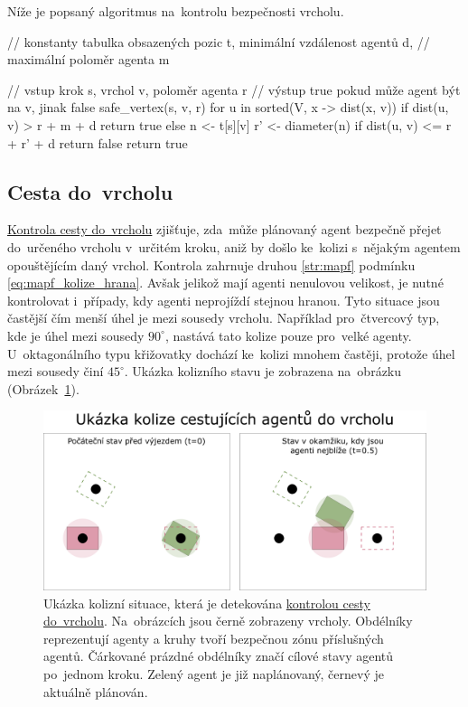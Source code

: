 Níže je popsaný algoritmus na~kontrolu bezpečnosti vrcholu.
\begin{code}
// konstanty tabulka obsazených pozic t, minimální vzdálenost agentů d,
// maximální poloměr agenta m

// vstup krok s, vrchol v, poloměr agenta r
// výstup true pokud může agent být na v, jinak false
safe_vertex(s, v, r)
for u in sorted(V, x -> dist(x, v))
if dist(u, v) > r + m + d return true
else
n <- t[s][v]
r' <- diameter(n)
if dist(u, v) <= r + r' + d return false
return true
\end{code}

\subsection{Cesta do~vrcholu}\label{subsec:cesta_do_vrcholu}


\hyperref[subsec:cesta_do_vrcholu]{Kontrola cesty do~vrcholu} zjišťuje,
zda~může plánovaný agent bezpečně přejet do~určeného vrcholu v~určitém kroku,
aniž by došlo ke~kolizi s~nějakým agentem opouštějícím daný vrchol.
Kontrola zahrnuje druhou \ref{str:mapf} podmínku
 \eqref{eq:mapf_kolize_hrana}.
Avšak jelikož mají agenti nenulovou velikost, je nutné kontrolovat i~případy, kdy agenti neprojíždí stejnou hranou.
Tyto situace jsou častější čím menší úhel je mezi sousedy vrcholu.
Například pro~čtvercový typ, kde je úhel mezi sousedy $90^\circ$, nastává tato kolize pouze pro~velké agenty.
U~oktagonálního typu křižovatky dochází ke~kolizi mnohem častěji, protože úhel mezi sousedy činí $45^\circ$.
Ukázka kolizního stavu je zobrazena na~obrázku (Obrázek~\ref{fig:kolize_cesta_do}).

\begin{figure}[h]
	\centering
	\includegraphics[width=\textwidth]{../img/kolize_cesta_do}
	\caption{
		Ukázka kolizní situace, která je detekována \hyperref[subsec:cesta_do_vrcholu]{kontrolou cesty do~vrcholu}.
		Na~obrázcích jsou černě zobrazeny vrcholy.
		Obdélníky reprezentují agenty a kruhy tvoří bezpečnou zónu příslušných agentů.
		Čárkované prázdné obdélníky značí cílové stavy agentů po~jednom kroku.
		Zelený agent je již naplánovaný, černevý je aktuálně plánován.
	}
	\label{fig:kolize_cesta_do}
\end{figure}


